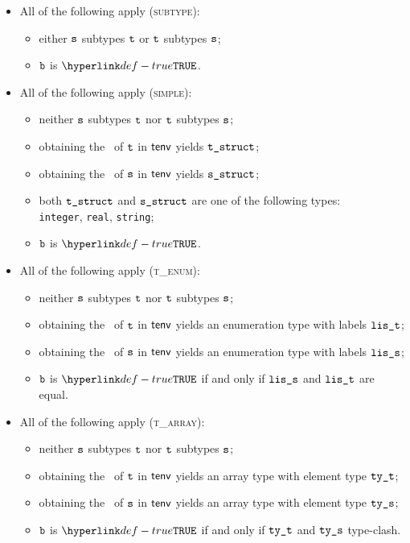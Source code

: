 \begin{itemize}
  \item All of the following apply (\textsc{subtype}):
  \begin{itemize}
    \item either $\texttt{s}$ subtypes $\texttt{t}$ or $\texttt{t}$ subtypes $\texttt{s}$;
    \item $\texttt{b}$ is $\True$.
  \end{itemize}

  \item All of the following apply (\textsc{simple}):
  \begin{itemize}
    \item neither $\texttt{s}$ subtypes $\texttt{t}$ nor $\texttt{t}$ subtypes $\texttt{s}$;
    \item obtaining the \structure\ of $\texttt{t}$ in $\textsf{tenv}$ yields $\texttt{t\_struct}$\ProseOrTypeError;
    \item obtaining the \structure\ of $\texttt{s}$ in $\textsf{tenv}$ yields $\texttt{s\_struct}$\ProseOrTypeError;
    \item both $\texttt{t\_struct}$ and $\texttt{s\_struct}$ are one of the following types: \\ \texttt{integer}, \texttt{real}, \texttt{string};
    \item $\texttt{b}$ is $\True$.
  \end{itemize}

  \item All of the following apply (\textsc{t\_enum}):
  \begin{itemize}
    \item neither $\texttt{s}$ subtypes $\texttt{t}$ nor $\texttt{t}$ subtypes $\texttt{s}$;
    \item obtaining the \structure\ of $\texttt{t}$ in $\textsf{tenv}$ yields an enumeration type with labels $\texttt{lis\_t}$;
    \item obtaining the \structure\ of $\texttt{s}$ in $\textsf{tenv}$ yields an enumeration type with labels $\texttt{lis\_s}$;
    \item $\texttt{b}$ is $\True$ if and only if $\texttt{lis\_s}$ and $\texttt{lis\_t}$ are equal.
  \end{itemize}

  \item All of the following apply (\textsc{t\_array}):
  \begin{itemize}
    \item neither $\texttt{s}$ subtypes $\texttt{t}$ nor $\texttt{t}$ subtypes $\texttt{s}$;
    \item obtaining the \structure\ of $\texttt{t}$ in $\textsf{tenv}$ yields an array type with element type $\texttt{ty\_t}$;
    \item obtaining the \structure\ of $\texttt{s}$ in $\textsf{tenv}$ yields an array type with element type $\texttt{ty\_s}$;
    \item $\texttt{b}$ is $\True$ if and only if $\texttt{ty\_t}$ and $\texttt{ty\_s}$ type-clash.
  \end{itemize}


\end{itemize}
